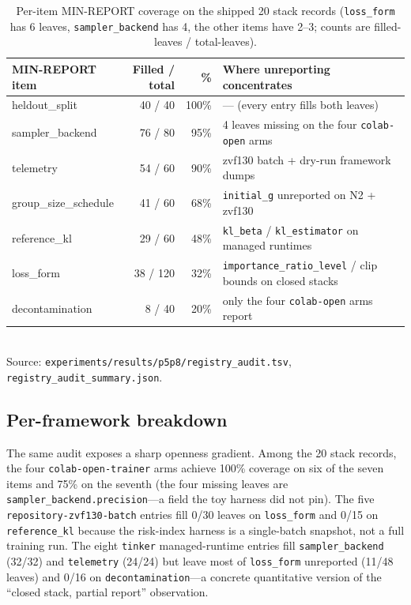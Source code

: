 \begin{table}[t]
\centering
\caption{Per-item MIN-REPORT coverage on the shipped 20 stack records
(\texttt{loss\_form} has 6 leaves, \texttt{sampler\_backend} has 4,
the other items have 2--3; counts are filled-leaves / total-leaves).}
\label{tab:p6-coverage}
\small
\begin{tabular}{lrrl}
\toprule
MIN-REPORT item & Filled / total & \% & Where unreporting concentrates \\
\midrule
heldout\_split       &  40 /  40 & 100\% & --- (every entry fills both leaves) \\
sampler\_backend     &  76 /  80 &  95\% & 4 leaves missing on the four \texttt{colab-open} arms \\
telemetry            &  54 /  60 &  90\% & zvf130 batch + dry-run framework dumps \\
group\_size\_schedule &  41 /  60 &  68\% & \texttt{initial\_g} unreported on N2 + zvf130 \\
reference\_kl        &  29 /  60 &  48\% & \texttt{kl\_beta} / \texttt{kl\_estimator} on managed runtimes \\
loss\_form           &  38 / 120 &  32\% & \texttt{importance\_ratio\_level} / clip bounds on closed stacks \\
decontamination      &   8 /  40 &  20\% & only the four \texttt{colab-open} arms report \\
\bottomrule
\end{tabular}\\
\footnotesize{Source: \texttt{experiments/results/p5p8/registry\_audit.tsv},
\texttt{registry\_audit\_summary.json}.}
\end{table}

\subsection{Per-framework breakdown}
The same audit exposes a sharp openness gradient. Among the 20 stack
records, the four \texttt{colab-open-trainer} arms achieve 100\% coverage
on six of the seven items and 75\% on the seventh (the four missing
leaves are \texttt{sampler\_backend.precision}---a field the toy harness
did not pin). The five \texttt{repository-zvf130-batch} entries fill 0/30
leaves on \texttt{loss\_form} and 0/15 on \texttt{reference\_kl} because
the risk-index harness is a single-batch snapshot, not a full training
run. The eight \texttt{tinker} managed-runtime entries fill
\texttt{sampler\_backend} (32/32) and \texttt{telemetry} (24/24) but
leave most of \texttt{loss\_form} unreported (11/48 leaves) and 0/16 on
\texttt{decontamination}---a concrete quantitative version of the
``closed stack, partial report'' observation.

